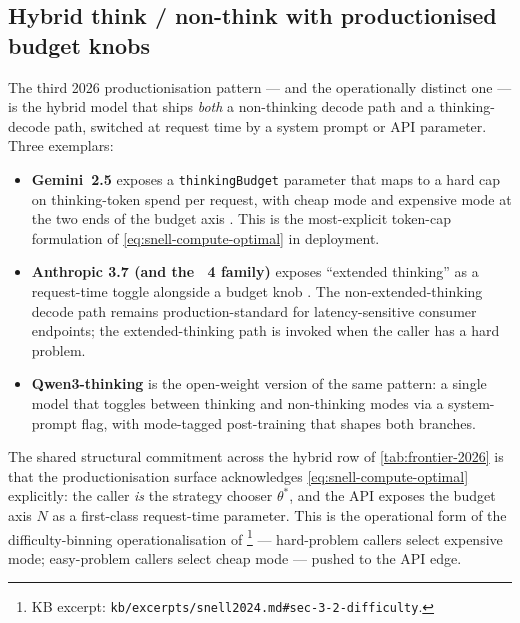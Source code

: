 \subsection{Hybrid think / non-think with productionised budget knobs}
\label{sec:frontier-hybrid-budget}

The third 2026 productionisation pattern --- and the operationally
distinct one --- is the hybrid model that ships \emph{both} a
non-thinking decode path and a thinking-decode path, switched at
request time by a system prompt or API parameter. Three exemplars:

\begin{itemize}
\item \textbf{Gemini~2.5} \citep{gemini2-5} exposes a
\texttt{thinkingBudget} parameter that maps to a hard cap on
thinking-token spend per request, with cheap mode and expensive mode at
the two ends of the budget axis .
This is the most-explicit token-cap formulation of
\cref{eq:snell-compute-optimal} in deployment.
\item \textbf{Anthropic  3.7 (and the ~4 family)} exposes
``extended thinking'' as a request-time toggle alongside a budget knob
. The non-extended-thinking decode path remains
production-standard for latency-sensitive consumer endpoints; the
extended-thinking path is invoked when the caller has a hard problem.
\item \textbf{Qwen3-thinking} 
is the open-weight version of the same pattern: a single model that
toggles between thinking and non-thinking modes via a system-prompt
flag, with mode-tagged post-training that shapes both branches.
\end{itemize}

The shared structural commitment across the hybrid row of
\cref{tab:frontier-2026} is that the productionisation surface
acknowledges \cref{eq:snell-compute-optimal} explicitly: the caller
\emph{is} the strategy chooser $\theta^\ast$, and the API exposes the
budget axis $N$ as a first-class request-time parameter. This is the
operational form of the difficulty-binning operationalisation of
\citet[\S 3.2]{snell2024}\footnote{KB excerpt:
\texttt{kb/excerpts/snell2024.md\#sec-3-2-difficulty}.} ---
hard-problem callers select expensive mode; easy-problem callers
select cheap mode --- pushed to the API edge.

